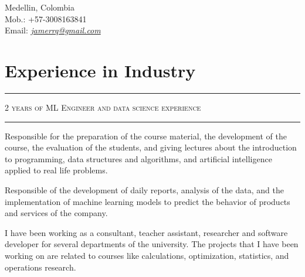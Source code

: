 \documentclass[]{rahulworld-resume}
\begin{document}
\hfill
\begin{minipage}[t]{0.66\textwidth}
\hspace*{0pt}\hfill    \\
\hspace*{0pt}\hfill    \\
\hspace*{0pt}\hfill Medellin, Colombia\\
\hspace*{0pt}\hfill Mob.: +57-3008163841 \\
\hspace*{0pt}\hfill Email: \textit{\href{mailto:janerrq@gmail.com}{jamerrq@gmail.com}}
\section{Experience in Industry}
\noindent\rule{12.5cm}{0.4pt}
\textsc{2 years of ML Engineer and data science experience}\\
\noindent\rule{12.5cm}{0.4pt}

 
\noindent
\hspace{5em}%
\begin{minipage}{0.85\textwidth\vspace{2pt}}
Responsible for the preparation of the course material,
the development of the course, the evaluation of the students,
and giving lectures about the introduction to programming,
data structures and algorithms, and artificial intelligence applied
to real life problems.

\end{minipage}

 
\noindent
\hspace{5em}%
\begin{minipage}{0.85\textwidth\vspace{2pt}}
Responsible of the development of daily reports, analysis of the data,
and the implementation of machine learning models to predict the
behavior of products and services of the company.
\end{minipage}
\sectionsep


 
\noindent
\hspace{5em}%
\begin{minipage}{0.85\textwidth\vspace{2pt}}
I have been working as a consultant, teacher assistant, researcher
and software developer for several departments of the university.
The projects that I have been working on are related to courses like
calculations, optimization, statistics, and operations research.
\end{minipage}
\sectionsep


\end{minipage}
\end{document}
